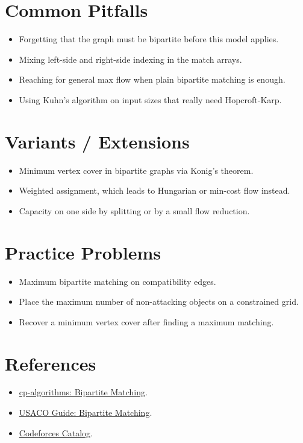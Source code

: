 \section*{Common Pitfalls}

\begin{itemize}
  \item Forgetting that the graph must be bipartite before this model applies.
  \item Mixing left-side and right-side indexing in the match arrays.
  \item Reaching for general max flow when plain bipartite matching is enough.
  \item Using Kuhn's algorithm on input sizes that really need Hopcroft-Karp.
\end{itemize}

\section*{Variants / Extensions}

\begin{itemize}
  \item Minimum vertex cover in bipartite graphs via Konig's theorem.
  \item Weighted assignment, which leads to Hungarian or min-cost flow instead.
  \item Capacity on one side by splitting or by a small flow reduction.
\end{itemize}

\section*{Practice Problems}

\begin{itemize}
  \item Maximum bipartite matching on compatibility edges.
  \item Place the maximum number of non-attacking objects on a constrained grid.
  \item Recover a minimum vertex cover after finding a maximum matching.
\end{itemize}

\section*{References}

\begin{itemize}
  \item \href{https://cp-algorithms.com/graph/kuhn_maximum_bipartite_matching.html}{cp-algorithms: Bipartite Matching}.
  \item \href{https://usaco.guide/adv/bipartite-matching}{USACO Guide: Bipartite Matching}.
  \item \href{https://codeforces.com/catalog}{Codeforces Catalog}.
\end{itemize}
